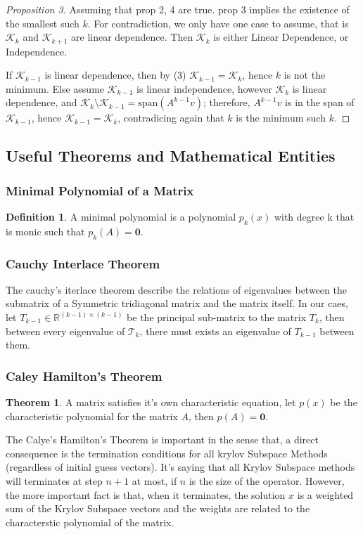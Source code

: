 \documentclass[]{article}
\theoremstyle{definition}
\newtheorem{theorem}{Theorem}
\newtheorem{definition}{Definition}
\begin{document}
            \begin{proof}[Proposition 3]
                Assuming that prop 2, 4 are true. prop 3 implies the existence of the smallest such $k$. For contradiction, we only have one case to assume, that is $\mathcal K_k$ and $\mathcal K_{k + 1}$ are linear dependence. Then $\mathcal K_k$ is either Linear Dependence, or Independence. 
                \par
                If $\mathcal K_{k - 1}$ is linear dependence, then by (3) $\mathcal K_{k - 1} = \mathcal K_k$, hence $k$ is not the minimum. Else assume $\mathcal K_{k - 1}$ is linear independence, however $\mathcal K_k$ is linear dependence, and $\mathcal K_k \setminus \mathcal K_{k - 1} = \text{span}(A^{k - 1}v)$; therefore, $A^{k -1}v$ is in the span of $\mathcal K_{k -1}$, hence $\mathcal K_{k -1} = \mathcal K_k$, contradicing again that $k$ is the minimum such $k$. 
            \end{proof}
    
    \subsection{Useful Theorems and Mathematical Entities}
        \subsubsection{Minimal Polynomial of a Matrix}
            \begin{definition}
                A minimal polynomial is a polynomial $p_k(x)$ with degree k that is monic such that $p_k(A) = \mathbf{0}$. 
            \end{definition}
        \subsubsection{Cauchy Interlace Theorem}
            The cauchy's iterlace theorem describe the relations of eigenvalues between the submatrix of a Symmetric tridiagonal matrix and the matrix itself. In our caes, let $T_{k-1}\in \mathbb R^{(k - 1)\times (k - 1)}$ be the principal sub-matrix to the matrix $T_k$, then between every eigenvalue of $\mathcal T_{k}$, there must exists an eigenvalue of $T_{k-1}$ between them. 
        \subsubsection{Caley Hamilton's Theorem}
            \begin{theorem}
                A matrix satisfies it's own characteristic equation, let $p(x)$ be the characteristic polynomial for the matrix $A$, then $p(A) = \mathbf 0$. 
            \end{theorem}
            The Calye's Hamilton's Theorem is important in the sense that, a direct consequence is the termination conditions for all krylov Subspace Methods (regardless of initial guess vectors). It's saying that all Krylov Subspace methods will terminates at step $n + 1$ at most, if $n$ is the size of the operator. However, the more important fact is that, when it terminates, the solution $x$ is a weighted sum of the Krylov Subspace vectors and the weights are related to the characterstic polynomial of the matrix. 
\end{document}
